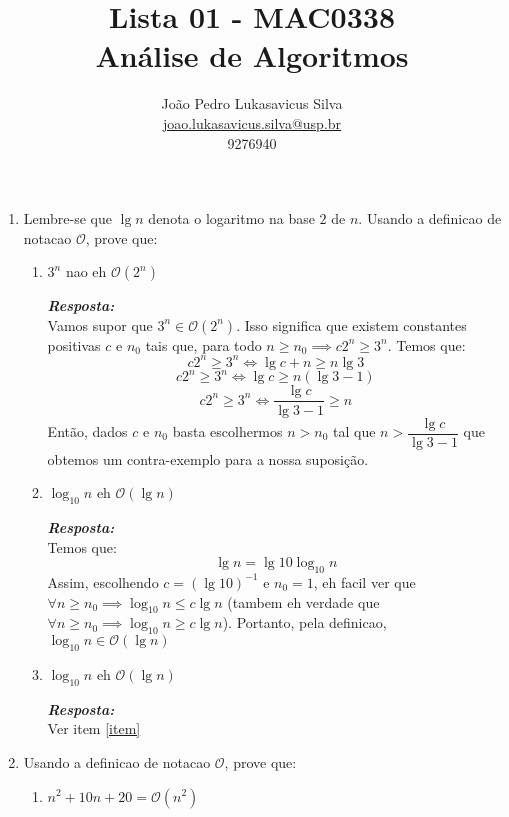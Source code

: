 \documentclass{article}
\title{
    Lista 01 - MAC0338\\
    Análise de Algoritmos
}
\author{
    João Pedro Lukasavicus Silva\\
    \href{mailto:joao.lukasavicus.silva@usp.br}
    {joao.lukasavicus.silva@usp.br}\\
    9276940
}
\begin{document}
\maketitle

\begin{enumerate}[itemsep=3ex, label=\textbf{\arabic*}.]
    \item \label{item1}
    Lembre-se que $\lg n$ denota o logaritmo na base $2$ de $n$. Usando a definicao de notacao $\mathcal{O}$, prove que:
    \begin{enumerate}
        \item
        $3^n$ nao eh $\mathcal{O}(2^n)$
      
        \textit{\textbf{Resposta:}}\\
        Vamos supor que $3^n \in \mathcal{O}(2^n)$. Isso significa que existem constantes positivas $c$ e $n_0$ tais que, para todo $n \geq n_0 \implies c 2^n \geq 3^n$. 
		Temos que:
		$$
		c 2^n \geq 3^n \iff \lg c + n \geq n \lg 3
	    $$
		$$
		c 2^n \geq 3^n \iff \lg c \geq n (\lg 3 - 1)
	    $$
		$$
		c 2^n \geq 3^n \iff \dfrac{\lg c}{\lg 3 - 1} \geq n
	    $$
		Então, dados $c$ e $n_0$ basta escolhermos $n > n_0$ tal que $n > \dfrac{\lg c}{\lg 3 - 1}$ que obtemos um contra-exemplo para a nossa suposição.
		
	    \item \label{item}
        $\log_{10}n$ eh $\mathcal{O}(\lg n)$
      
        \textit{\textbf{Resposta:}}\\
        Temos que:
        $$
        \lg n = \lg 10 \log_{10} n
        $$
        Assim, escolhendo $c = (\lg 10)^{-1}$ e $n_0 = 1$, eh facil ver que $\forall n \geq n_0 \implies \log_{10} n \leq c \lg n$ (tambem eh verdade que $\forall n \geq n_0 \implies \log_{10} n \geq c \lg n$). Portanto, pela definicao, $\log_{10}n \in \mathcal{O}(\lg n)$
        
        \item
        $\log_{10}n$ eh $\mathcal{O}(\lg n)$
      
        \textit{\textbf{Resposta:}}\\
        Ver item \ref{item}
        
    \end{enumerate}
    
    \item
    Usando a definicao de notacao $\mathcal{O}$, prove que:
    
    \begin{enumerate}
        \item
        $n^2 + 10n + 20 = \mathcal{O}(n^2)$
        

\end{enumerate}
\end{enumerate}
\end{document}

